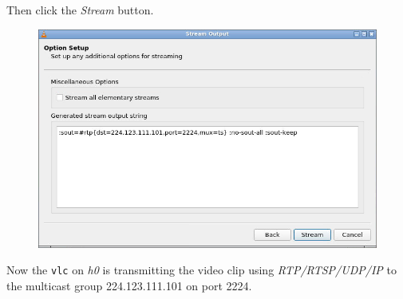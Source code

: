 \documentclass{../UTNetLab}
\begin{document}
    Then click the \textit{Stream} button.
    \begin{figure}[H]
        \centering
        \includegraphics[scale=1.8]{img/stream5}
    \end{figure}
    Now the \lstinline{vlc} on \textit{h0} is transmitting the video clip using \textit{RTP/RTSP/UDP/IP} to the multicast group {224.123.111.101} on port {2224}. 
\end{document}
